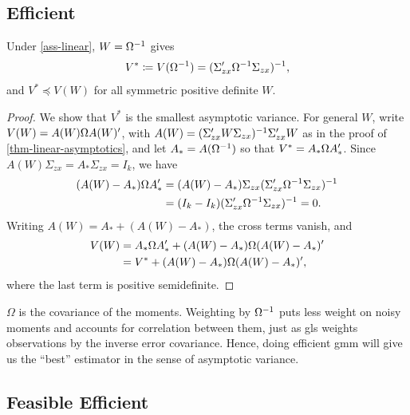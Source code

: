 \documentclass[a4paper,12pt]{article}
\begin{document}
\subsection{Efficient }

\begin{theorem}\label{thm-efficient}
	Under \autoref{ass-linear}, $W=\Omega^{-1}$ gives
	\begin{align}
		V^*\coloneqq V(\Omega^{-1})=(\Sigma_{zx}^{\prime}\Omega^{-1}\Sigma_{zx})^{-1},
	\end{align}
	and $V^*\preceq V(W)$ for all symmetric positive definite $W$.
\end{theorem}
\begin{proof}
	We show that $V^*$ is the smallest asymptotic variance.
	For general $W$, write $V(W)=A(W)\Omega A(W)^{\prime}$,
	with $A(W)=(\Sigma_{zx}^{\prime} W\Sigma_{zx})^{-1}\Sigma_{zx}^{\prime} W$ as in the proof of \autoref{thm-linear-asymptotics},
	and let $A_*=A(\Omega^{-1})$ so that $V^*=A_*\Omega A_*^{\prime}$.
	Since $A(W)\Sigma_{zx}=A_*\Sigma_{zx}=I_k$, we have
	\begin{align*}
		(A(W)-A_*)\Omega A_*^{\prime}
		&=(A(W)-A_*)\Sigma_{zx}(\Sigma_{zx}^{\prime}\Omega^{-1}\Sigma_{zx})^{-1} \\
		&=(I_k-I_k)(\Sigma_{zx}^{\prime}\Omega^{-1}\Sigma_{zx})^{-1}
		=0.
	\end{align*}
	Writing $A(W)=A_*+(A(W)-A_*)$, the cross terms vanish, and
	\begin{align*}
		V(W)
		&= A_*\Omega A_*^{\prime}+(A(W)-A_*)\Omega(A(W)-A_*)^{\prime} \\
		&= V^*+(A(W)-A_*)\Omega(A(W)-A_*)^{\prime},
	\end{align*}
	where the last term is positive semidefinite.
\end{proof}

\begin{remark}[Intuition]
	$\Omega$ is the covariance of the moments.
	Weighting by $\Omega^{-1}$ puts less weight on noisy moments and accounts for correlation between them,
	just as \gls{gls} weights observations by the inverse error covariance.
	Hence, doing efficient \gls{gmm} will give us the ``best'' estimator in the sense of asymptotic variance.
\end{remark}

\subsection{Feasible Efficient }
\end{document}
